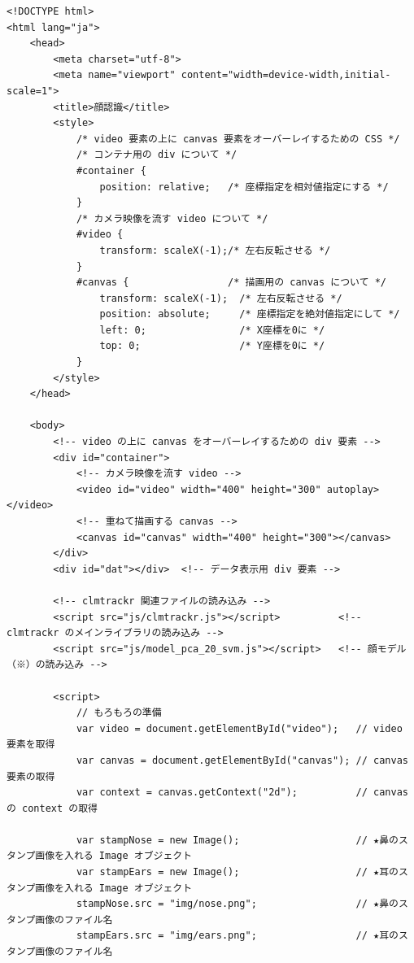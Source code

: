 \documentclass[mingoth,11pt,a4j,uplatex]{jsarticle}
\begin{document}
\begin{lstlisting}[caption=07-04.html]
<!DOCTYPE html>
<html lang="ja">
    <head>
        <meta charset="utf-8">
        <meta name="viewport" content="width=device-width,initial-scale=1">
        <title>顔認識</title>
        <style>
            /* video 要素の上に canvas 要素をオーバーレイするための CSS */
            /* コンテナ用の div について */
            #container {              
                position: relative;   /* 座標指定を相対値指定にする */
            }
            /* カメラ映像を流す video について */
            #video {                  
                transform: scaleX(-1);/* 左右反転させる */
            }
            #canvas {                 /* 描画用の canvas について */
                transform: scaleX(-1);  /* 左右反転させる */
                position: absolute;     /* 座標指定を絶対値指定にして */
                left: 0;                /* X座標を0に */
                top: 0;                 /* Y座標を0に */
            }
        </style>
    </head>

    <body>
        <!-- video の上に canvas をオーバーレイするための div 要素 -->
        <div id="container">  
            <!-- カメラ映像を流す video -->
            <video id="video" width="400" height="300" autoplay></video>
            <!-- 重ねて描画する canvas -->
            <canvas id="canvas" width="400" height="300"></canvas>        
        </div>
        <div id="dat"></div>  <!-- データ表示用 div 要素 -->
        
        <!-- clmtrackr 関連ファイルの読み込み -->
        <script src="js/clmtrackr.js"></script>          <!-- clmtrackr のメインライブラリの読み込み -->
        <script src="js/model_pca_20_svm.js"></script>   <!-- 顔モデル（※）の読み込み -->
        
        <script>
            // もろもろの準備
            var video = document.getElementById("video");   // video 要素を取得
            var canvas = document.getElementById("canvas"); // canvas 要素の取得
            var context = canvas.getContext("2d");          // canvas の context の取得
            
            var stampNose = new Image();                    // ★鼻のスタンプ画像を入れる Image オブジェクト
            var stampEars = new Image();                    // ★耳のスタンプ画像を入れる Image オブジェクト
            stampNose.src = "img/nose.png";                 // ★鼻のスタンプ画像のファイル名
            stampEars.src = "img/ears.png";                 // ★耳のスタンプ画像のファイル名
            

\end{lstlisting}
\end{document}

